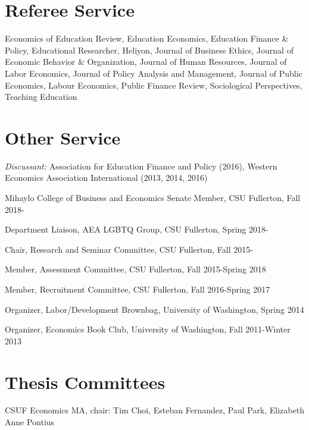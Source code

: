\documentclass[11pt,a4paper,sans]{moderncv}
\begin{document}
\section{Referee Service}  
  
Economics of Education Review, Education Economics, Education Finance \& Policy, Educational Researcher, Heliyon, Journal of Business Ethics, Journal of Economic Behavior \& Organization, Journal of Human Resources, Journal of Labor Economics, Journal of Policy Analysis and Management, Journal of Public Economics, Labour Economics, Public Finance Review, Sociological Perspectives, Teaching Education



\section{Other Service}  
  
\emph{Discussant:} Association for Education Finance and Policy (2016), Western Economics Association International (2013, 2014, 2016)



Mihaylo College of Business and Economics Senate Member, CSU Fullerton, Fall 2018-



Department Liaison, AEA LGBTQ Group, CSU Fullerton, Spring 2018-



Chair, Research and Seminar Committee, CSU Fullerton, Fall 2015-



Member, Assessment Committee, CSU Fullerton, Fall 2015-Spring 2018



Member, Recruitment Committee, CSU Fullerton, Fall 2016-Spring 2017



Organizer, Labor/Development Brownbag, University of Washington, Spring 2014



Organizer, Economics Book Club, University of Washington, Fall 2011-Winter 2013



\section{Thesis Committees}  
  
CSUF Economics MA, chair: Tim Choi, Esteban Fernandez, Paul Park, Elizabeth Anne Pontius
\end{document}
